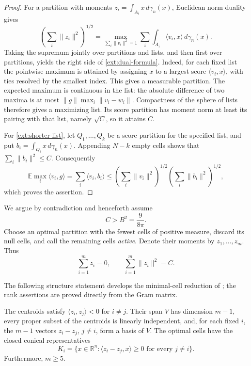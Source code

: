 \begin{proof}
For a partition with moments $z_i=\int_{A_i}x\,d\gamma_n(x)$,
Euclidean norm duality gives
\[
 \left(\sum_i\|z_i\|^2\right)^{1/2}
 =\max_{\sum_i\|v_i\|^2=1}
       \sum_i\int_{A_i}\langle v_i,x\rangle\,d\gamma_n(x).
\]
Taking the supremum jointly over partitions and lists, and then first
over partitions, yields the right side of \eqref{ext:dual-formula}.
Indeed, for each fixed list the pointwise maximum is attained by assigning
$x$ to a largest score $\langle v_i,x\rangle$, with ties resolved by the
smallest index. This gives a measurable partition. The expected maximum
is continuous in the list: the absolute difference of two maxima is at
most $\|g\|\max_i\|v_i-w_i\|$. Compactness of the sphere of lists therefore
gives a maximizing list. Its score partition has moment norm at least
its pairing with that list, namely $\sqrt C$, so it attains $C$.

For \eqref{ext:shorter-list}, let $Q_1,\ldots,Q_k$ be a score partition
for the specified list, and put $b_i=\int_{Q_i}x\,d\gamma_n(x)$.
Appending $N-k$ empty cells shows that $\sum_i\|b_i\|^2\le C$.
Consequently
\[
 \mathbb E\max_i\langle v_i,g\rangle
 =\sum_i\langle v_i,b_i\rangle
 \le\left(\sum_i\|v_i\|^2\right)^{1/2}
      \left(\sum_i\|b_i\|^2\right)^{1/2},
\]
which proves the assertion.
\end{proof}

We argue by contradiction and henceforth assume
\begin{equation}\label{ext:contradiction}
 C>B^2=\frac{9}{8\pi}.
\end{equation}
Choose an optimal partition with the fewest cells of positive measure,
discard its null cells, and call the remaining cells \emph{active}.
Denote their moments by
$z_1,\ldots,z_m$. Thus
\begin{equation}\label{ext:centroid-identities}
 \sum_{i=1}^m z_i=0,
 \qquad \sum_{i=1}^m\|z_i\|^2=C.
\end{equation}

The following structure statement develops the minimal-cell reduction
of \cite[Lemma~3.3]{KhotNaor}; the rank assertions are proved directly
from the Gram matrix.

\begin{lemma}\label{ext:structure}
The centroids satisfy $\langle z_i,z_j\rangle<0$ for $i\ne j$.
Their span $V$ has dimension $m-1$, every proper subset of the centroids
is linearly independent, and, for each fixed $i$, the $m-1$ vectors
$z_i-z_j$, $j\ne i$, form a basis of $V$.
The optimal cells have the closed conical representatives
\begin{equation}\label{ext:cones}
 K_i=\{x\in\mathbb R^n:
          \langle z_i-z_j,x\rangle\ge0\text{ for every }j\ne i\}.
\end{equation}
Furthermore, $m\ge5$.
\end{lemma}

